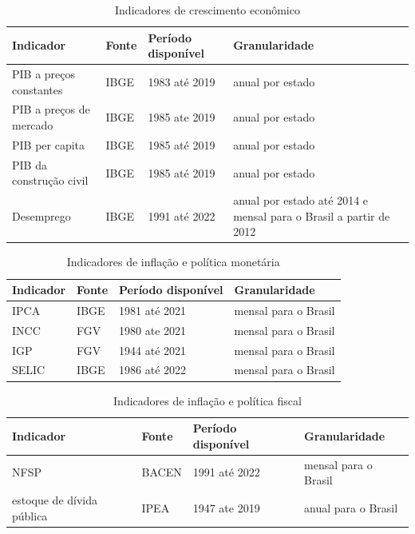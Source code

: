 \begin{table}[H]
    \centering
    \caption{Indicadores de crescimento econômico}
    \begin{tabular}{llll}
        \toprule
        Indicador                   & Fonte & Período disponível & Granularidade         \\
        \midrule
        PIB a preços constantes     & IBGE  & 1983 até 2019      & anual por estado      \\
        PIB a preços de mercado     & IBGE  & 1985 ate 2019      & anual por estado      \\
        PIB per capita              & IBGE  & 1985 até 2019      & anual por estado      \\
        PIB da construção civil     & IBGE  & 1985 até 2019      & anual por estado      \\
        Desemprego                  & IBGE  & 1991 até 2022      & anual por estado até 2014 e mensal para o Brasil a partir de 2012      \\
        \bottomrule
    \end{tabular}
\end{table}

\begin{table}[H]
    \centering
    \caption{Indicadores de inflação e política monetária}
    \begin{tabular}{llll}
        \toprule
        Indicador                   & Fonte & Período disponível & Granularidade         \\
        \midrule
        IPCA                        & IBGE  & 1981 até 2021      & mensal para o Brasil      \\
        INCC                        & FGV   & 1980 ate 2021      & mensal para o Brasil      \\
        IGP                         & FGV   & 1944 até 2021      & mensal para o Brasil      \\
        SELIC                       & IBGE  & 1986 até 2022      & mensal para o Brasil      \\
        \bottomrule
    \end{tabular}
\end{table}

\begin{table}[H]
    \centering
    \caption{Indicadores de inflação e política fiscal}
    \begin{tabular}{llll}
        \toprule
        Indicador                   & Fonte & Período disponível & Granularidade         \\
        \midrule
        NFSP                        & BACEN  & 1991 até 2022      & mensal para o Brasil      \\
        estoque de dívida pública   & IPEA   & 1947 ate 2019      & anual para o Brasil      \\
        \bottomrule
    \end{tabular}
\end{table}

